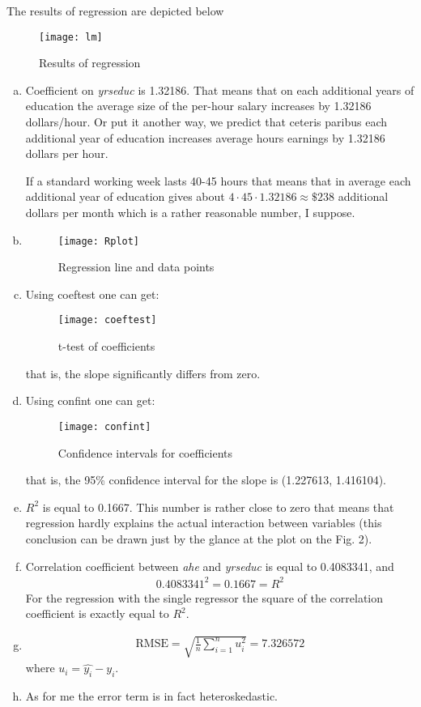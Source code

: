 \documentclass[a4paper]{article}
\begin{document}
The results of regression are depicted below
\begin{figure}[h]
	\centering
	\texttt{[image: lm]}
	\caption{Results of regression}
\end{figure}
\begin{enumerate}[a.]
	\item Coefficient on \textit{yrseduc} is 1.32186. That means that on each additional years of education the average size of the per-hour salary increases by 1.32186 dollars/hour. Or put it another way, we predict that ceteris paribus each additional year of education increases average hours earnings by 1.32186 dollars per hour. 
	
	
	If a standard working week lasts 40-45 hours that means that in average each additional year of education gives about $4 \cdot 45 \cdot 1.32186 \approx \$238$ additional dollars per month which is a rather reasonable number, I suppose.
	\item \begin{figure}[h]
		\centering
		\texttt{[image: Rplot]}
		\caption{Regression line and data points}
	\end{figure}
\newpage
\item Using coeftest one can get:
 \begin{figure}[h]
	\centering
	\texttt{[image: coeftest]}
	\caption{t-test of coefficients}
\end{figure}



that is, the slope significantly differs from zero.
\item Using confint one can get:
\begin{figure}[h]
	\centering
	\texttt{[image: confint]}
	\caption{Confidence intervals for coefficients}
\end{figure}




that is, the 95\% confidence interval for the slope is (1.227613, 1.416104).
\item $R^2$ is equal to 0.1667. This number is rather close to zero that means that regression hardly explains the actual interaction between variables (this conclusion can be drawn just by the glance at the plot on the Fig. 2).
\item Correlation coefficient between \textit{ahe} and \textit{yrseduc} is equal to 0.4083341, and 
\begin{align*}
0.4083341^2 = 0.1667 = R^2
\end{align*}
For the regression with the single regressor the square of the correlation coefficient is exactly equal to $R^2$.
\item 
\begin{align*}
\text{RMSE} = \sqrt{\frac{1}{n}\sum_{i=1}^n u_i^2} = 7.326572
\end{align*}
where $u_i = \hat{y_i} - y_i$.
\item As for me the error term is in fact heteroskedastic.
\end{enumerate}
\end{document}
